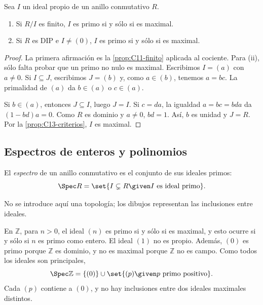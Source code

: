 \begin{prop}\label{prop:C13-primo-maximal}
Sea $I$ un ideal propio de un anillo conmutativo $R$.
\begin{enumerate}[label=\textup{(\roman*)}]
\item Si $R/I$ es finito, $I$ es primo si y sólo si es maximal.
\item Si $R$ es DIP e $I\ne(0)$, $I$ es primo si y sólo si es maximal.
\end{enumerate}
\end{prop}
\begin{proof}
La primera afirmación es la \cref{prop:C11-finito} aplicada al cociente. Para (ii), sólo falta probar que un primo no nulo es maximal. Escribimos $I=(a)$ con $a\ne0$. Si $I\subseteq J$, escribimos $J=(b)$ y, como $a\in(b)$, tenemos $a=bc$. La primalidad de $(a)$ da $b\in(a)$ o $c\in(a)$.

Si $b\in(a)$, entonces $J\subseteq I$, luego $J=I$. Si $c=da$, la igualdad $a=bc=bda$ da $(1-bd)a=0$. Como $R$ es dominio y $a\ne0$, $bd=1$. Así, $b$ es unidad y $J=R$. Por la \cref{prop:C13-criterios}, $I$ es maximal.
\end{proof}

\subsection{Espectros de enteros y polinomios}
\begin{defi}
El \emph{espectro} de un anillo conmutativo es el conjunto de sus ideales primos:
\[
\Spec R=\set{I\subsetneq R\given I\text{ es ideal primo}}.
\]
\end{defi}
No se introduce aquí una topología; los dibujos representan las inclusiones entre ideales.

En $\mathbb Z$, para $n>0$, el ideal $(n)$ es primo si y sólo si es maximal, y esto ocurre si y sólo si $n$ es primo como entero. El ideal $(1)$ no es propio. Además, $(0)$ es primo porque $\mathbb Z$ es dominio, y no es maximal porque $\mathbb Z$ no es campo. Como todos los ideales son principales,
\[
\Spec\mathbb Z=\{(0)\}\cup\set{(p)\given p\text{ primo positivo}}.
\]
Cada $(p)$ contiene a $(0)$, y no hay inclusiones entre dos ideales maximales distintos.

